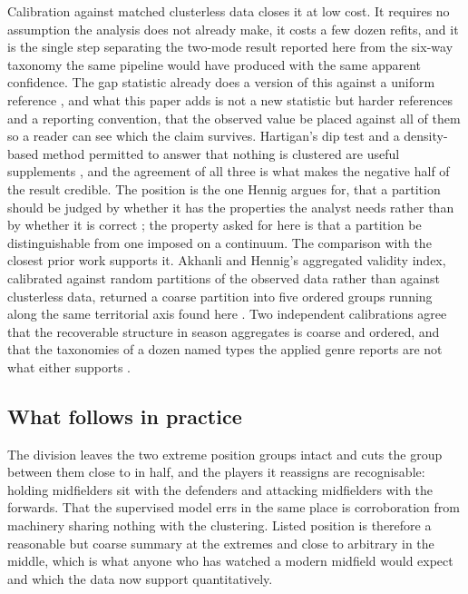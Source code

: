 Calibration against matched clusterless data closes it at low cost. It requires no assumption the
analysis does not already make, it costs a few dozen refits, and it is the single step separating
the two-mode result reported here from the six-way taxonomy the same pipeline would have produced
with the same apparent confidence. The gap statistic already does a version of this against a
uniform reference \citep{tibshirani2001estimating}, and what this paper adds is not a new
statistic but harder references and a reporting convention, that the observed value be placed
against all of them so a reader can see which the claim survives. Hartigan's dip test and a
density-based method permitted to answer that nothing is clustered are useful supplements
\citep{hartigan1985dip, adolfsson2019cluster, campello2013density}, and the agreement of all three
is what makes the negative half of the result credible. The position is the one Hennig argues for,
that a partition should be judged by whether it has the properties the analyst needs rather than
by whether it is correct \citep{hennig2015true}; the property asked for here is that a partition
be distinguishable from one imposed on a continuum. The comparison with the closest prior work
supports it. Akhanli and Hennig's aggregated validity index, calibrated against random partitions
of the observed data rather than against clusterless data, returned a coarse partition into five
ordered groups running along the same territorial axis found here \citep{akhanli2020comparing,
akhanli2023clustering}. Two independent calibrations agree that the recoverable structure in
season aggregates is coarse and ordered, and that the taxonomies of a dozen named types the
applied genre reports are not what either supports \citep{elfoukahi2026unveiling,
plakias2023identifying, alagappan2012from, kalman2020nba}.

\subsection{What follows in practice}

The division leaves the two extreme position groups intact and cuts the group between them close
to in half, and the players it reassigns are recognisable: holding midfielders sit with the
defenders and attacking midfielders with the forwards. That the supervised model errs in the same
place is corroboration from machinery sharing nothing with the clustering. Listed position is
therefore a reasonable but coarse summary at the extremes and close to arbitrary in the middle,
which is what anyone who has watched a modern midfield would expect and which the data now support
quantitatively.

